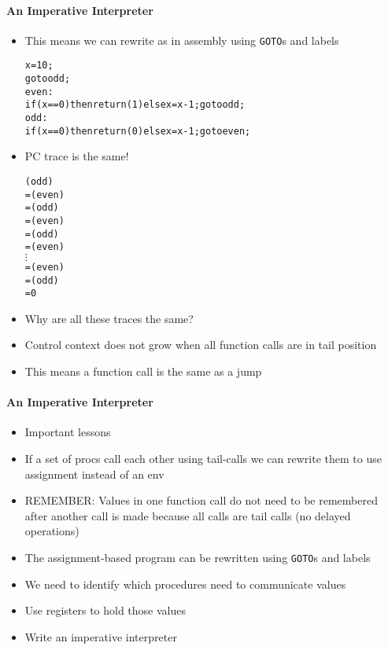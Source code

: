 \documentclass{beamer}
\newcommand{\vdotss}{\(\vdots\)}
\begin{document}
\begin{frame}[fragile]
\framesubtitle{An Imperative Interpreter}
\begin{scriptsize}
\begin{itemize}
\item<1-> This means we can rewrite as in assembly using \texttt{GOTO}s and labels
\begin{alltt}
x = 10;
goto odd;
even: 
  if (x == 0) then return(1) else {x = x-1; goto odd;}
odd: 
  if (x == 0) then return(0) else {x = x-1; goto even;}
\end{alltt}

\item<2-> PC trace is the same!
\begin{alltt}
(odd)
=  (even)
=  (odd)
=  (even)
=  (odd)
=  (even)
   \vdotss{}
=  (even)
=  (odd)
= 0
\end{alltt}

\item<3-> Why are all these traces the same?

\item<4-> Control context does not grow when all function calls are in tail position

\item<4-> This means a function call is the same as a jump

\end{itemize}
\end{scriptsize}
\end{frame}

\begin{frame}[fragile]
\framesubtitle{An Imperative Interpreter}
\begin{scriptsize}
\begin{itemize}
\item<1-> Important lessons

\item<1-> If a set of procs call each other using tail-calls we can rewrite them to use assignment instead of an env
    
\item<1->REMEMBER: Values in one function call do not need to be remembered after another call is made because all calls are tail calls (no delayed operations)

\item<2-> The assignment-based program can be rewritten using \texttt{GOTO}s and labels
    
\item<3-> We need to identify which procedures need to communicate values

\item<3-> Use registers to hold those values

\item<3-> Write an imperative interpreter

\end{itemize}
\end{scriptsize}
\end{frame}
\end{document}

